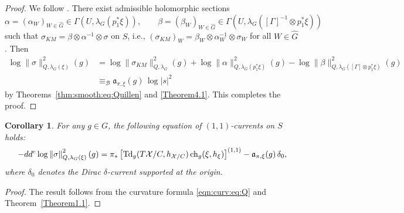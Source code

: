 \documentclass[amscd, leqno]{amsart}
\theoremstyle{plain}
\newtheorem{corollary}[theorem]{Corollary}
\theoremstyle{definition}
\theoremstyle{remark}
\newenvironment{pf}{\begin{proof}}{\end{proof}}
\begin{document}
\begin{pf}
We follow \cite[Th.\,5.9]{Bismut97}. There exist admissible holomorphic sections
$$
\alpha=(\alpha_{W})_{W\in\widehat{G}}\in\Gamma(U,\lambda_{G}(p_{1}^{*}\xi)),
\qquad
\beta=(\beta_{W})_{W\in\widehat{G}}\in\Gamma(U,\lambda_{G}([\Gamma]^{-1}\otimes p_{1}^{*}\xi))
$$
such that $\sigma_{KM}=\beta\otimes\alpha^{-1}\otimes\sigma$ on $S$, i.e., 
$(\sigma_{KM})_{W}=\beta_{W}\otimes\alpha_{W}^{-1}\otimes\sigma_{W}$ for all $W\in\widehat{G}$. Then
$$
\begin{aligned}
\log \|\sigma\|^{2}_{Q,\lambda_{G}(\xi)}(g)
&=
\log \|\sigma_{KM}\|^{2}_{Q,\lambda_{G}}(g) + \log \|\alpha\|^{2}_{Q,\lambda_{G}(p_{1}^{*}\xi)}(g)
-
\log \|\beta\|^{2}_{Q,\lambda_{G}([\Gamma]\otimes p_{1}^{*}\xi)}(g)
\\
&\equiv_{\mathcal B}
{\mathfrak a}_{\pi,\xi}(g)\,\log | s |^{2}
\end{aligned}
$$
by Theorems~\ref{thm:smooth:eq:Quillen} and \ref{Theorem4.1}. This completes the proof.
\end{pf}


\begin{corollary}
\label{cor:curv:current}
For any $g \in G$, the following equation of $(1,1)$-currents on $S$ holds:
$$
-dd^{c} \log \left\| \sigma \right\|_{Q,\lambda_{G}(\xi)}^{2}(g)
=
\pi_{*} \left[ {\rm Td}_{g}(T{\mathcal X}/C,h_{{\mathcal X}/C})\,{\rm ch}_{g}(\xi,h_{\xi}) \right]^{(1,1)} - {\mathfrak a}_{\pi,\xi}(g)\, \delta_{0},
$$
where $\delta_{0}$ denotes the Dirac $\delta$-current supported at the origin.
\end{corollary}

\begin{pf}
The result follows from the curvature formula \eqref{eqn:curv:eq:Q} and Theorem~\ref{Theorem1.1}.
\end{pf}



\end{document}
